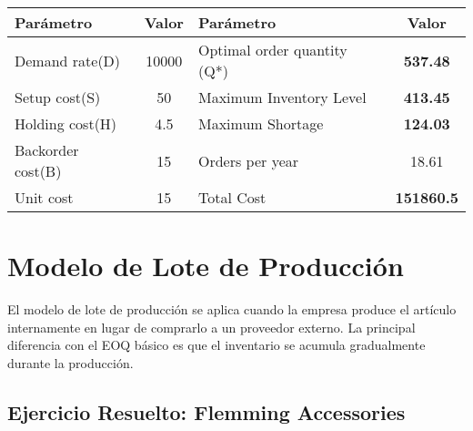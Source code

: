 \documentclass[12pt,a4paper]{book}
\begin{document}
	\begin{tcolorbox}[enhanced,colback=grisclaro,colframe=grisoScuro,boxrule=2pt,arc=8pt,
		title={\bfseries\color{white} \faTable\ TABLA DE RESULTADOS}]
		
		\begin{center}
			\small
			\begin{tabular}{|l|c|l|c|}
				\hline
				\rowcolor{azulclaro}
				\textbf{Parámetro} & \textbf{Valor} & \textbf{Parámetro} & \textbf{Valor} \\
				\hline
				Demand rate(D) & 10000 & Optimal order quantity (Q*) & \textcolor{verdeprincipal}{\textbf{537.48}} \\
				\hline
				Setup cost(S) & 50 & Maximum Inventory Level & \textcolor{azulprincipal}{\textbf{413.45}} \\
				\hline
				Holding cost(H) & 4.5 & Maximum Shortage & \textcolor{rojoacento}{\textbf{124.03}} \\
				\hline
				Backorder cost(B) & 15 & Orders per year & 18.61 \\
				\hline
				Unit cost & 15 & Total Cost & \textcolor{moradoacento}{\textbf{151860.5}} \\
				\hline
			\end{tabular}
		\end{center}
		
	\end{tcolorbox}
	
	\section{Modelo de Lote de Producción}
	
	\begin{tcolorbox}[enhanced,colback=verdeclaro,colframe=verdeprincipal,boxrule=3pt,arc=12pt,
		drop shadow,title={\Large\bfseries\color{white} \faCogs\ FUNDAMENTOS DEL MODELO}]
		
		El modelo de lote de producción se aplica cuando la empresa produce el artículo internamente en lugar de comprarlo a un proveedor externo. La principal diferencia con el EOQ básico es que el inventario se acumula gradualmente durante la producción.
		
	\end{tcolorbox}
	
	\subsection{Ejercicio Resuelto: Flemming Accessories}
	
\end{document}
